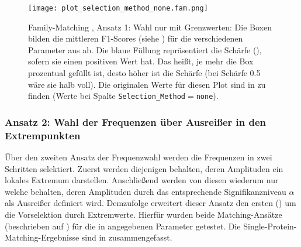             \begin{figure}[H]
                \texttt{[image: plot\_selection\_method\_none.fam.png]}
                \caption[Family-Matching , Ansatz 1: Wahl nur mit Grenzwerten]{Family-Matching , Ansatz 1: Wahl nur mit Grenzwerten: Die Boxen bilden die mittleren F1-Scores (siehe ) für die verschiedenen Parameter aus  ab. Die blaue Füllung repräsentiert die Schärfe (), sofern sie einen positiven Wert hat. Das heißt, je mehr die Box prozentual gefüllt ist, desto höher ist die Schärfe (bei Schärfe 0.5 wäre sie halb voll). Die originalen Werte für diesen Plot sind in  zu finden (Werte bei Spalte \texttt{Selection\_Method}$=$\texttt{none}).}
                \label{fig:selection_method.none.fam}
            \end{figure}

        \subsubsection{Ansatz 2: Wahl der Frequenzen über Ausreißer in den Extrempunkten} %
        \label{ssub:ansatz_2_results}
        Über den zweiten Ansatz der Frequenzwahl werden die Frequenzen in zwei Schritten selektiert. Zuerst werden diejenigen behalten, deren Amplituden ein lokales Extremum darstellen. Anschließend werden von diesen wiederum nur welche behalten, deren Amplituden durch das entsprechende Signifikanzniveau $\alpha$ als Ausreißer definiert wird. Demzufolge erweitert dieser Ansatz den ersten () um die Vorselektion durch Extremwerte. Hierfür wurden beide Matching-Ansätze (beschrieben auf ) für die in  angegebenen Parameter getestet. Die Single-Protein-Matching-Ergebnisse sind in  zusammengefasst.
        
